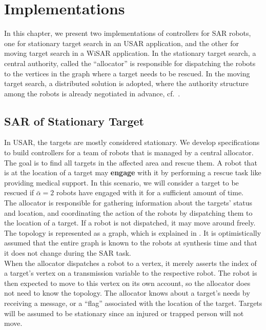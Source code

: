 \chapter{Implementations} \label{sec:impl}

In this chapter, we present two implementations of controllers for SAR robots, one for stationary target search in an USAR application, and the other for moving target search in a WiSAR application. In the stationary target search, a central authority, called the ``allocator'' is responsible for dispatching the robots to the vertices in the graph where a target needs to be rescued. In the moving target search, a distributed solution is adopted, where the authority structure among the robots is already negotiated in advance, cf.\ .\\

\section{SAR of Stationary Target} \label{sec:statSAR}

In USAR, the targets are mostly considered stationary. We develop specifications to build controllers for a team of robots that is managed by a central allocator. The goal is to find all targets in the affected area and rescue them. A robot that is at the location of a target may {\bf engage} with it by performing a rescue task like providing medical support. In this scenario, we will consider a target to be rescued if $\bar{\alpha} = 2$ robots have engaged with it for a sufficient amount of time.\\

The allocator is responsible for gathering information about the targets' status and location, and coordinating the action of the robots by dispatching them to the location of a target. If a robot is not dispatched, it may move around freely. The topology is represented as a graph, which is explained in . It is optimistically assumed that the entire graph is known to the robots at synthesis time and that it does not change during the SAR task.\\



When the allocator dispatches a robot to a vertex, it merely asserts the index of a target's vertex on a transmission variable to the respective robot. The robot is then expected to move to this vertex on its own account, so the allocator does not need to know the topology. The allocator knows about a target's needs by receiving a message, or a ``flag'' associated with the location of the target. Targets will be assumed to be stationary since an injured or trapped person will not move.\\

